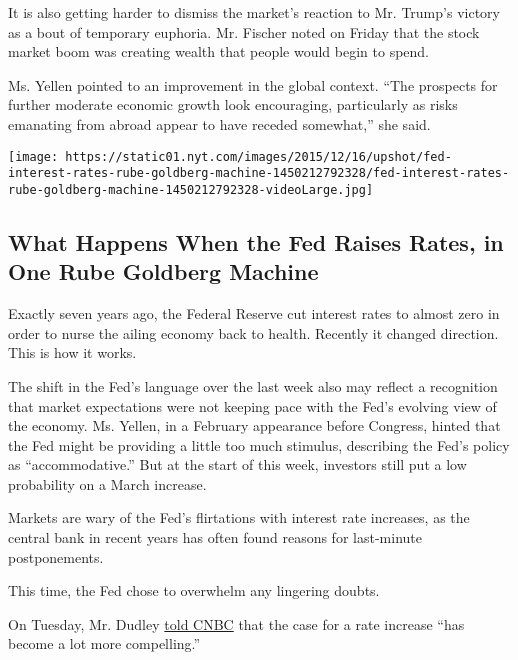 It is also getting harder to dismiss the market's reaction to Mr.
Trump's victory as a bout of temporary euphoria. Mr. Fischer noted on
Friday that the stock market boom was creating wealth that people would
begin to spend.

Ms. Yellen pointed to an improvement in the global context. ``The
prospects for further moderate economic growth look encouraging,
particularly as risks emanating from abroad appear to have receded
somewhat,'' she said.

\href{https://www.nytimes.com/interactive/2015/12/16/upshot/fed-interest-rates-rube-goldberg-machine.html}{}

\texttt{[image: https://static01.nyt.com/images/2015/12/16/upshot/fed-interest-rates-rube-goldberg-machine-1450212792328/fed-interest-rates-rube-goldberg-machine-1450212792328-videoLarge.jpg]}

\hypertarget{what-happens-when-the-fed-raises-rates-in-one-rube-goldberg-machine}{%
\subsection{What Happens When the Fed Raises Rates, in One Rube Goldberg
Machine}\label{what-happens-when-the-fed-raises-rates-in-one-rube-goldberg-machine}}

Exactly seven years ago, the Federal Reserve cut interest rates to
almost zero in order to nurse the ailing economy back to health.
Recently it changed direction. This is how it works.

The shift in the Fed's language over the last week also may reflect a
recognition that market expectations were not keeping pace with the
Fed's evolving view of the economy. Ms. Yellen, in a February appearance
before Congress, hinted that the Fed might be providing a little too
much stimulus, describing the Fed's policy as ``accommodative.'' But at
the start of this week, investors still put a low probability on a March
increase.

Markets are wary of the Fed's flirtations with interest rate increases,
as the central bank in recent years has often found reasons for
last-minute postponements.

This time, the Fed chose to overwhelm any lingering doubts.

On Tuesday, Mr. Dudley
\href{http://www.cnbc.com/2017/02/28/case-for-fed-rate-hike-now-a-lot-more-compelling-dudley.html}{told
CNBC} that the case for a rate increase ``has become a lot more
compelling.''

